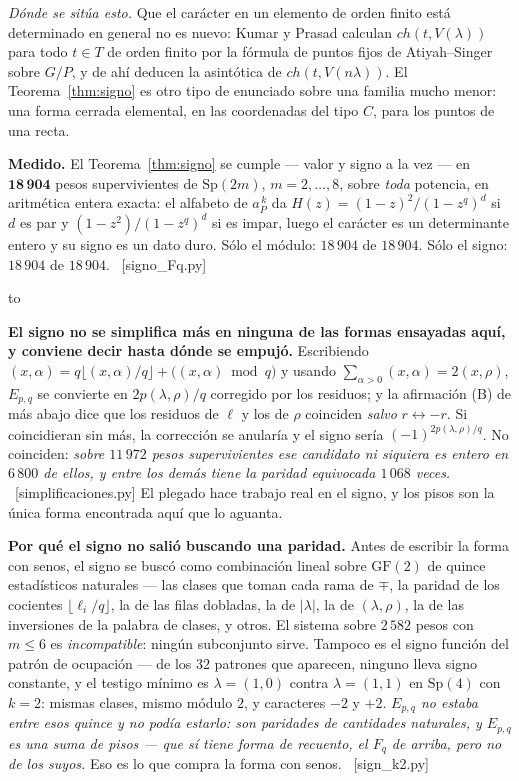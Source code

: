 \documentclass[11pt,a4paper]{article}
\newcommand{\Sp}{\mathrm{Sp}}
\newcommand{\ver}[1]{\unskip\penalty0\ \textcolor{azul}{\small\textsf{[#1]}}}
\newenvironment{keybox}
  {\par\vspace{9pt}\begin{lrbox}{\fichabox}%
   \begin{minipage}{0.90\textwidth}\vspace{7pt}\setlength{\parskip}{3pt}}
  {\vspace{7pt}\end{minipage}\end{lrbox}%
   \par\noindent\hbox to \textwidth{\hfill
   \textcolor{azul}{\rule[-\dp\fichabox]{3.2pt}{\dimexpr\ht\fichabox+\dp\fichabox\relax}}%
   \colorbox{fondoficha}{\usebox{\fichabox}}\hfill}%
   \par\vspace{9pt}}
\begin{document}
\smallskip
\noindent \emph{Dónde se sitúa esto.} Que el carácter en un elemento de orden finito está
determinado en general no es nuevo: Kumar y Prasad \cite{KP24} calculan $ch(t,V(\lambda))$ para todo
$t\in T$ de orden finito por la fórmula de puntos fijos de Atiyah--Singer sobre $G/P$, y de ahí
deducen la asintótica de $ch(t,V(n\lambda))$. El Teorema~\ref{thm:signo} es otro tipo de enunciado
sobre una familia mucho menor: una forma cerrada elemental, en las coordenadas del tipo $C$, para los
puntos de una recta.

\begin{keybox}
\textbf{Medido.} El Teorema~\ref{thm:signo} se cumple --- valor y signo a la vez --- en
$\mathbf{18\,904}$ pesos supervivientes de $\Sp(2m)$, $m=2,\dots,8$, sobre \emph{toda} potencia, en
aritmética entera exacta: el alfabeto de $a_P^{\,k}$ da $H(z)=(1-z)^2/(1-z^q)^d$ si $d$ es par y
$(1-z^2)/(1-z^q)^d$ si es impar, luego el carácter es un determinante entero y su signo es un dato
duro. Sólo el módulo: $18\,904$ de $18\,904$. Sólo el signo: $18\,904$ de $18\,904$.
\ver{signo\_Fq.py}
\end{keybox}

\noindent \textbf{El signo no se simplifica más en ninguna de las formas ensayadas aquí, y conviene
decir hasta dónde se empujó.}
Escribiendo $(x,\alpha)=q\lfloor(x,\alpha)/q\rfloor+\bigl((x,\alpha)\bmod q\bigr)$ y usando
$\sum_{\alpha>0}(x,\alpha)=2(x,\rho)$, $E_{p,q}$ se convierte en $2p(\lambda,\rho)/q$ corregido por
los residuos; y la afirmación (B) de más abajo dice que los residuos de $\ell$ y los de $\rho$
coinciden \emph{salvo} $r\leftrightarrow-r$. Si coincidieran sin más, la corrección se anularía y el
signo sería $(-1)^{2p(\lambda,\rho)/q}$. No coinciden: \emph{sobre $11\,972$ pesos supervivientes ese
candidato ni siquiera es entero en $6\,800$ de ellos, y entre los demás tiene la paridad equivocada
$1\,068$ veces.} \ver{simplificaciones.py} El plegado hace trabajo real en el signo, y los pisos son
la única forma encontrada aquí que lo aguanta.

\smallskip
\noindent \textbf{Por qué el signo no salió buscando una paridad.} Antes de escribir la forma con
senos, el signo se buscó como combinación lineal sobre $\mathrm{GF}(2)$ de quince estadísticos
naturales --- las clases que toman cada rama de $\mp$, la paridad de los cocientes
$\lfloor\ell_i/q\rfloor$, la de las filas dobladas, la de $|\lambda|$, la de $(\lambda,\rho)$, la de
las inversiones de la palabra de clases, y otros. El sistema sobre $2\,582$ pesos con $m\le6$ es
\emph{incompatible}: ningún subconjunto sirve. Tampoco es el signo función del patrón de ocupación
--- de los $32$ patrones que aparecen, ninguno lleva signo constante, y el testigo mínimo es
$\lambda=(1,0)$ contra $\lambda=(1,1)$ en $\Sp(4)$ con $k=2$: mismas clases, mismo módulo $2$,
y caracteres $-2$ y $+2$. \emph{$E_{p,q}$ no estaba entre esos quince y no podía estarlo: son
paridades de cantidades naturales, y $E_{p,q}$ es una suma de pisos --- que sí tiene forma de
recuento, el $F_q$ de arriba, pero no de los suyos.} Eso es lo que compra la forma con senos. \ver{sign\_k2.py}
\end{document}
